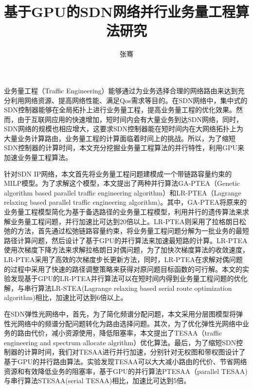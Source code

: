 \documentclass[master]{thesis-uestc}
\title{基于GPU的SDN网络并行业务量工程算法研究}
\author{张骞}
\begin{document}
\begin{chineseabstract}
业务量工程（Traffic Engineering）能够通过为业务选择合理的网络路由来达到充分利用网络资源、提高网络性能、满足Qos需求等目的。在SDN网络中，集中式的SDN控制器能够在全局拓扑上进行业务量工程，提高业务量工程的优化效果。然而，由于互联网应用的快速增加，短时间内会有大量业务到达SDN网络，同时，SDN网络的规模也相应增大，这要求SDN控制器能在短时间内在大网络拓扑上为大量业务计算路由，业务量工程的计算面临着时间上的挑战。所以，为了缩短SDN控制器的计算时间，本文充分挖掘业务量工程算法的并行特性，利用GPU来加速业务量工程算法。

针对SDN IP网络，本文首先将业务量工程问题建模成一个带链路容量约束的MILP模型。为了求解这个模型，本文提出了两种并行算法GA-PTEA（Genetic algorithm based parallel traffic engineering algorithm）和LR-PTEA（Lagrange relaxing based parallel traffic engineering algorithm)。其中，GA-PTEA将原来的业务量工程模型简化为基于备选路径的业务量工程模型，利用并行的遗传算法来求解业务量工程问题，并行加速比可达到20倍以上。LR-PTEA则采用了拉格朗日松弛的方法，首先通过松弛链路容量约束，将业务量工程问题分解为一批业务的最短路径计算问题，然后设计了基于GPU的并行算法来加速最短路的计算。LR-PTEA使用次梯度下降方法来求解拉格朗日对偶问题，为了加快次梯度算法的收敛速度，LR-PTEA采用了高效的次梯度步长更新方法，同时，LR-PTEA在求解对偶问题的过程中采用了快速的路径调整策略来获得对原问题目标函数的可行解。本文的实验发现基于GPU的LR-PTEA并行算法可以在短时间内得到业务量工程问题的优化解，与串行算法LR-STEA(Lagrange relaxing based serial route optimization algorithm)相比，加速比可达到6倍以上。

在SDN弹性光网络中，首先，为了简化频谱分配问题，本文采用分层图模型将弹性光网络中的频谱分配问题转化为路由选择问题。其次，为了优化弹性光网络中业务的路由代价，减小资源使用，降低阻塞率，本文提出了TESAA（traffic engineering and spectrum allocate algrithm）优化算法。最后，为了缩短SDN控制器的计算时间，我们对TESAA进行并行加速，分别针对无权图和带权图设计了基于GPU的并行路由算法。实验发现TESAA可以大大减小路由的代价、节省网络资源和有效降低业务的阻塞率，基于GPU的并行算法PTESAA（parallel TESAA)与串行算法STESAA(serial TESAA)相比，加速比可达到5倍。

\end{chineseabstract}
\end{document}
